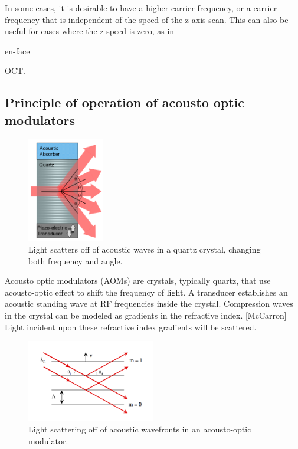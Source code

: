 In some cases, it is desirable to have a higher carrier frequency, or a carrier frequency that is independent of the speed of the z-axis scan. This can also be useful for cases where the z speed is zero, as in \begin{em}en-face\end{em} OCT. \cite{bouma}

\subsection{Principle of operation of acousto optic modulators}

\begin{figure}[h!]
\centering
\includegraphics[width=0.3\textwidth]{Images/Background/aom.png}
\caption{Light scatters off of acoustic waves in a quartz crystal, changing both frequency and angle.}
\end{figure}

Acousto optic modulators (AOMs) are crystals, typically quartz, that use acousto-optic effect to shift the frequency of light. A transducer establishes an acoustic standing wave at RF frequencies inside the crystal. Compression waves in the crystal can be modeled as gradients in the refractive index. [McCarron] Light incident upon these refractive index gradients will be scattered.

\begin{figure}[h!]
\centering
\includegraphics[width=0.5\textwidth]{Images/Background/aom_scattering.png}
\caption{Light scattering off of acoustic wavefronts in an acousto-optic modulator.}
\end{figure}

